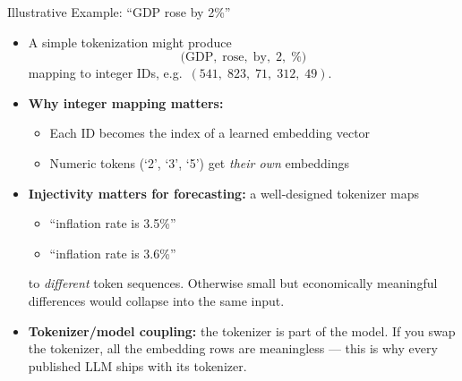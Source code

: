 \begin{frame}{Illustrative Example: ``GDP rose by 2\%''}
\begin{itemize}
\item A simple tokenization might produce
\[
   \text{(GDP},\; \text{rose},\; \text{by},\; \text{2},\; \%\text{)}
\]
mapping to integer IDs, e.g.\ $(541,\; 823,\; 71,\; 312,\; 49)$.

\medskip
\item \textbf{Why integer mapping matters:}
\begin{itemize}
    \item Each ID becomes the index of a learned embedding vector
    \item Numeric tokens (`2', `3', `5') get \emph{their own} embeddings
\end{itemize}

\medskip
\item \textbf{Injectivity matters for forecasting:} a well-designed tokenizer maps
\begin{itemize}
    \item ``inflation rate is 3.5\%''
    \item ``inflation rate is 3.6\%''
\end{itemize}
to \emph{different} token sequences. Otherwise small but economically meaningful differences would collapse into the same input.

\medskip
\item \textbf{Tokenizer/model coupling:} the tokenizer is part of the model. If you swap the tokenizer, all the embedding rows are meaningless --- this is why every published LLM ships with its tokenizer.
\end{itemize}
\end{frame}

